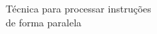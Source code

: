 \documentclass[preview]{standalone}
\begin{document}
Técnica para processar instruções\\de forma paralela\\
\end{document}
